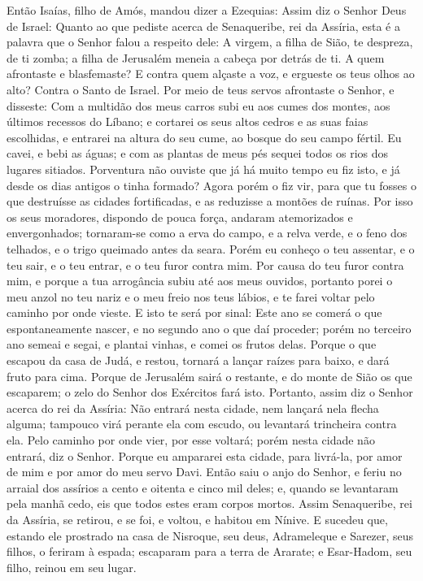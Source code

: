 Então Isaías, filho de Amós, mandou dizer a Ezequias: Assim diz o
Senhor Deus de Israel: Quanto ao que pediste acerca de Senaqueribe,
rei da Assíria, esta é a palavra que o Senhor falou a
respeito dele: A virgem, a filha de Sião, te despreza, de ti zomba;
a filha de Jerusalém meneia a cabeça por detrás de ti. A quem
afrontaste e blasfemaste? E contra quem alçaste a voz, e ergueste os
teus olhos ao alto? Contra o Santo de Israel. Por meio de
teus servos afrontaste o Senhor, e disseste: Com a multidão dos meus
carros subi eu aos cumes dos montes, aos últimos recessos do Líbano;
e cortarei os seus altos cedros e as suas faias escolhidas, e
entrarei na altura do seu cume, ao bosque do seu campo fértil.
Eu cavei, e bebi as águas; e com as plantas de meus pés
sequei todos os rios dos lugares sitiados. Porventura não
ouviste que já há muito tempo eu fiz isto, e já desde os dias
antigos o tinha formado? Agora porém o fiz vir, para que tu fosses o
que destruísse as cidades fortificadas, e as reduzisse a montões de
ruínas. Por isso os seus moradores, dispondo de pouca força,
andaram atemorizados e envergonhados; tornaram-se como a erva do
campo, e a relva verde, e o feno dos telhados, e o trigo queimado
antes da seara. Porém eu conheço o teu assentar, e o teu
sair, e o teu entrar, e o teu furor contra mim. Por causa do
teu furor contra mim, e porque a tua arrogância subiu até aos meus
ouvidos, portanto porei o meu anzol no teu nariz e o meu freio nos
teus lábios, e te farei voltar pelo caminho por onde vieste.
E isto te será por sinal: Este ano se comerá o que
espontaneamente nascer, e no segundo ano o que daí proceder; porém
no terceiro ano semeai e segai, e plantai vinhas, e comei os frutos
delas. Porque o que escapou da casa de Judá, e restou,
tornará a lançar raízes para baixo, e dará fruto para cima.
Porque de Jerusalém sairá o restante, e do monte de Sião os
que escaparem; o zelo do Senhor dos Exércitos fará isto.
Portanto, assim diz o Senhor acerca do rei da Assíria: Não
entrará nesta cidade, nem lançará nela flecha alguma; tampouco virá
perante ela com escudo, ou levantará trincheira contra ela.
Pelo caminho por onde vier, por esse voltará; porém nesta
cidade não entrará, diz o Senhor. Porque eu ampararei esta
cidade, para livrá-la, por amor de mim e por amor do meu servo Davi.
Então saiu o anjo do Senhor, e feriu no arraial dos assírios
a cento e oitenta e cinco mil deles; e, quando se levantaram pela
manhã cedo, eis que todos estes eram corpos mortos. Assim
Senaqueribe, rei da Assíria, se retirou, e se foi, e voltou, e
habitou em Nínive. E sucedeu que, estando ele prostrado na
casa de Nisroque, seu deus, Adrameleque e Sarezer, seus filhos, o
feriram à espada; escaparam para a terra de Ararate; e Esar-Hadom,
seu filho, reinou em seu lugar.

